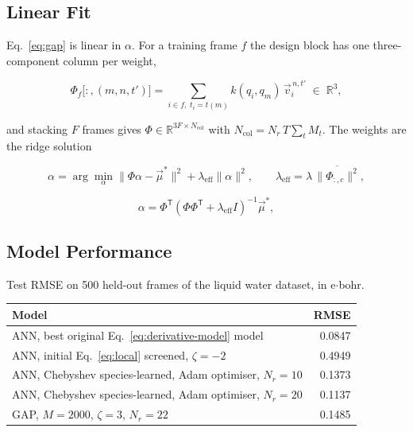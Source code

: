 \documentclass[11pt,a4paper]{article}
\begin{document}
\subsection{Linear Fit}

Eq.~\ref{eq:gap} is linear in $\alpha$. For a training frame $f$ the design
block has one three-component column per weight,

\begin{equation}
    \Phi_f\big[:, (m,n,t')\big] = \sum_{i \in f,\; t_i = t(m)}
        k(q_i, q_m)\, \vec{v}_i^{\,n,t'} \;\in\; \mathbb{R}^3,
\end{equation}

and stacking $F$ frames gives $\Phi \in \mathbb{R}^{3F \times N_{\mathrm{col}}}$ with
$N_{\mathrm{col}} = N_r\, T \sum_t M_t$. The weights are the ridge solution

\begin{equation}
    \alpha = \arg\min_\alpha \|\Phi\alpha - \vec{\mu}^{*}\|^2
        + \lambda_{\mathrm{eff}} \|\alpha\|^2,
    \qquad
    \lambda_{\mathrm{eff}} = \lambda\, \overline{\|\Phi_{:,c}\|^2},
    \label{eq:ridge}
\end{equation}

\begin{equation}
    \alpha = \Phi^{\mathsf{T}} \left(\Phi\Phi^{\mathsf{T}}
        + \lambda_{\mathrm{eff}} I\right)^{-1} \vec{\mu}^{*},
    \label{eq:dual}
\end{equation}

\subsection{Model Performance}

Test RMSE on 500 held-out frames of the liquid water dataset, in
e$\cdot$bohr.

\begin{center}
\begin{tabular}{lr}
\hline
Model & RMSE \\
\hline
ANN, best original Eq.~\ref{eq:derivative-model} model & 0.0847 \\
ANN, initial Eq.~\ref{eq:local} screened, $\zeta = -2$ & 0.4949 \\
ANN, Chebyshev species-learned, Adam optimiser, $N_r = 10$ & 0.1373 \\
ANN, Chebyshev species-learned, Adam optimiser, $N_r = 20$ & 0.1137 \\
GAP, $M = 2000$, $\zeta = 3$, $N_r = 22$ & 0.1485 \\
\hline
\end{tabular}
\end{center}
\end{document}
